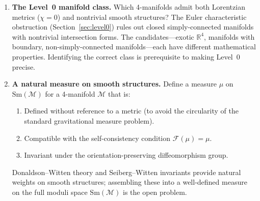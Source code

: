 \documentclass[12pt,a4paper]{article}
\theoremstyle{definition}
\theoremstyle{remark}
\begin{document}
\begin{enumerate}
The measure-theoretic clock conditioning
(Definition~\ref{def:measure_pw}) resolves the circularity in the
Page--Wootters mechanism: the conditioning is reformulated as an
operation on the self-consistency measure $\mu^*$, without presupposing
a total Hilbert space. The mixture decomposition
(Proposition~\ref{prop:mixture}), the classical character of Riemannian
conditioning (Proposition~\ref{prop:riem_classical}), and the quantum
character of Lorentzian conditioning
(Proposition~\ref{prop:lor_quantum}) are all Rigorous. The remaining open question is whether the $c$-dependence
reduces to unitary time evolution. In the toy model, the $c$-dependence
is genuinely non-unitary: magnitude profiles $|\mu_{S|c}(s)|$ vary
significantly across $c$ (magnitude variation $\sim 0.33$), and the
conditional states do not lie on a one-parameter unitary orbit (orbit
error $\sim 1.0$ for $d_{\mathrm{clock}} \geq 3$). No parameter
regime tested produces approximate unitarity. The measure-theoretic
construction resolves the \emph{algebraic} circularity (no total Hilbert
space needed) but does not reproduce the \emph{dynamical} content of
Page--Wootters (unitary time evolution). Closing this gap likely requires
a semiclassical clock limit ($d_{\mathrm{clock}} \gg d_{\mathrm{sys}}$
with structured clock--system interaction).

\item \textbf{The Level~0 manifold class.}
Which 4-manifolds admit both Lorentzian metrics ($\chi = 0$) and
nontrivial smooth structures? The Euler characteristic obstruction
(Section~\ref{sec:level0}) rules out closed simply-connected manifolds
with nontrivial intersection forms. The candidates---exotic
$\mathbb{R}^4$, manifolds with boundary, non-simply-connected
manifolds---each have different mathematical properties. Identifying the
correct class is prerequisite to making Level~0 precise.

\item \textbf{A natural measure on smooth structures.}
Define a measure $\mu$ on $\mathrm{Sm}(\mathcal{M})$ for a 4-manifold
$\mathcal{M}$ that is:
\begin{enumerate}
\item Defined without reference to a metric (to avoid the circularity of
the standard gravitational measure problem).
\item Compatible with the self-consistency condition
$\mathcal{F}(\mu) = \mu$.
\item Invariant under the orientation-preserving diffeomorphism group.
\end{enumerate}
Donaldson--Witten theory and Seiberg--Witten invariants provide natural
weights on smooth structures; assembling these into a well-defined
measure on the full moduli space $\mathrm{Sm}(\mathcal{M})$ is the open
problem.

\end{enumerate}
\end{document}
